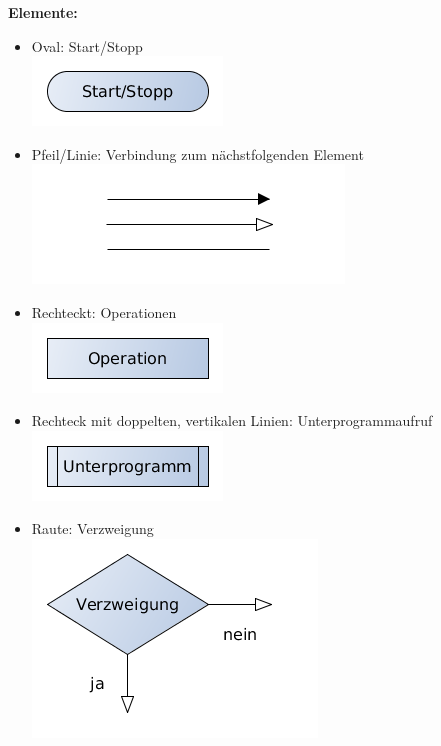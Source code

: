 {\bf Elemente:}\\
\begin{itemize}
	\item Oval: Start/Stopp\\
		\includegraphics[scale=0.5]{1jahr_pictures/lf06prog-pic/lf06prog-pap-start-stopp.png}
	\item Pfeil/Linie: Verbindung zum nächstfolgenden Element\\
		\includegraphics[scale=0.5]{1jahr_pictures/lf06prog-pic/lf06prog-pap-pfeil.png}
	\item Rechteckt: Operationen\\
		\includegraphics[scale=0.5]{1jahr_pictures/lf06prog-pic/lf06prog-pap-operation.png}	
	\item Rechteck mit doppelten, vertikalen Linien: Unterprogrammaufruf\\
		\includegraphics[scale=0.5]{1jahr_pictures/lf06prog-pic/lf06prog-pap-unterprogramm.png}	
	\item Raute: Verzweigung\\
		\includegraphics[scale=0.5]{1jahr_pictures/lf06prog-pic/lf06prog-pap-verzweigung.png}	

\end{itemize}
